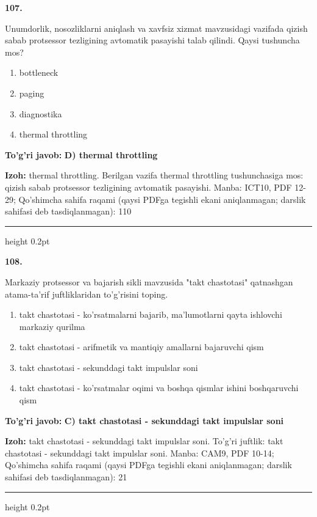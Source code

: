 \documentclass[10pt,a4paper]{article}
\begin{document}
{\bfseries\sffamily\color{ink} 107.}
\par
Unumdorlik, nosozliklarni aniqlash va xavfsiz xizmat mavzusidagi vazifada qizish sabab protsessor tezligining avtomatik pasayishi talab qilindi. Qaysi tushuncha mos?
\begin{enumerate}[label=\Alph*),leftmargin=9mm]
\item bottleneck
\item paging
\item diagnostika
\item thermal throttling
\end{enumerate}
\begin{tcolorbox}[enhanced,breakable,colback=teal!4,colframe=teal!60!black,boxrule=0.45pt,arc=1.2mm,left=2.7mm,right=2.7mm,top=1.8mm,bottom=1.8mm,before skip=2mm,after skip=2mm]
{\bfseries\sffamily\color{teal}To'g'ri javob:} \textbf{D) thermal throttling}
\par\smallskip
{\bfseries Izoh:} thermal throttling. Berilgan vazifa thermal throttling tushunchasiga mos: qizish sabab protsessor tezligining avtomatik pasayishi. Manba: ICT10, PDF 12-29; Qo'shimcha sahifa raqami (qaysi PDFga tegishli ekani aniqlanmagan; darslik sahifasi deb tasdiqlanmagan): 110
\end{tcolorbox}
\vspace{2mm}\hrule height 0.2pt\vspace{3mm}

{\bfseries\sffamily\color{ink} 108.}
\par
Markaziy protsessor va bajarish sikli mavzusida "takt chastotasi" qatnashgan atama-ta'rif juftliklaridan to'g'risini toping.
\begin{enumerate}[label=\Alph*),leftmargin=9mm]
\item takt chastotasi - ko'rsatmalarni bajarib, ma'lumotlarni qayta ishlovchi markaziy qurilma
\item takt chastotasi - arifmetik va mantiqiy amallarni bajaruvchi qism
\item takt chastotasi - sekunddagi takt impulslar soni
\item takt chastotasi - ko'rsatmalar oqimi va boshqa qismlar ishini boshqaruvchi qism
\end{enumerate}
\begin{tcolorbox}[enhanced,breakable,colback=teal!4,colframe=teal!60!black,boxrule=0.45pt,arc=1.2mm,left=2.7mm,right=2.7mm,top=1.8mm,bottom=1.8mm,before skip=2mm,after skip=2mm]
{\bfseries\sffamily\color{teal}To'g'ri javob:} \textbf{C) takt chastotasi - sekunddagi takt impulslar soni}
\par\smallskip
{\bfseries Izoh:} takt chastotasi - sekunddagi takt impulslar soni. To'g'ri juftlik: takt chastotasi - sekunddagi takt impulslar soni. Manba: CAM9, PDF 10-14; Qo'shimcha sahifa raqami (qaysi PDFga tegishli ekani aniqlanmagan; darslik sahifasi deb tasdiqlanmagan): 21
\end{tcolorbox}
\vspace{2mm}\hrule height 0.2pt\vspace{3mm}
\end{document}
